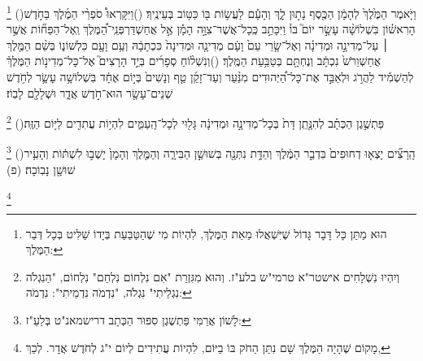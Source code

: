\documentclass[12pt, openany]{book}
\newcommand{\footnotecomment}[1]{
	\renewcommand\thefootnote{}
	\footnote{\textsf{#1}}}
\newcommand{\commenta}[1]{\footnotecomment{#1}\hspace{0em}}
\newcommand{\vsnum}[1]{(\hebrewnumeral{#1})\space}
\begin{document}
{\commenta{ הוּא מַתַּן כָּל דָּבָר גָּדוֹל שֶׁיִּשְׁאֲלוּ מֵאֵת הַמֶּלֶךְ, לִהְיוֹת מִי שֶׁהַטַּבַּעַת בְּיָדוֹ שַׁלִּיט בְּכָל דְּבַר הַמֶּלֶךְ: }%
\vsnum{11}וַיֹּ֤אמֶר הַמֶּ֙לֶךְ֙ לְהָמָ֔ן הַכֶּ֖סֶף נָת֣וּן לָ֑ךְ וְהָעָ֕ם לַעֲשׂ֥וֹת בּ֖וֹ כַּטּ֥וֹב בְּעֵינֶֽיךָ׃
\vsnum{12}וַיִּקָּרְאוּ֩ סֹפְרֵ֨י הַמֶּ֜לֶךְ בַּחֹ֣דֶשׁ הָרִאשׁ֗וֹן בִּשְׁלוֹשָׁ֨ה עָשָׂ֣ר יוֹם֮ בּוֹ֒ וַיִּכָּתֵ֣ב כְּֽכָל־אֲשֶׁר־צִוָּ֣ה הָמָ֡ן אֶ֣ל אֲחַשְׁדַּרְפְּנֵֽי־הַ֠מֶּלֶךְ וְֽאֶל־הַפַּח֞וֹת אֲשֶׁ֣ר ׀ עַל־מְדִינָ֣ה וּמְדִינָ֗ה וְאֶל־שָׂ֤רֵי עַם֙ וָעָ֔ם מְדִינָ֤ה וּמְדִינָה֙ כִּכְתָבָ֔הּ וְעַ֥ם וָעָ֖ם כִּלְשׁוֹנ֑וֹ בְּשֵׁ֨ם הַמֶּ֤לֶךְ אֲחַשְׁוֵרֹשׁ֙ נִכְתָּ֔ב וְנֶחְתָּ֖ם בְּטַבַּ֥עַת הַמֶּֽלֶךְ׃
\vsnum{13}וְנִשְׁל֨וֹחַ סְפָרִ֜ים בְּיַ֣ד הָרָצִים֮ אֶל־כָּל־מְדִינ֣וֹת הַמֶּלֶךְ֒ לְהַשְׁמִ֡יד לַהֲרֹ֣ג וּלְאַבֵּ֣ד אֶת־כָּל־הַ֠יְּהוּדִים מִנַּ֨עַר וְעַד־זָקֵ֜ן טַ֤ף וְנָשִׁים֙ בְּי֣וֹם אֶחָ֔ד בִּשְׁלוֹשָׁ֥ה עָשָׂ֛ר לְחֹ֥דֶשׁ שְׁנֵים־עָשָׂ֖ר הוּא־חֹ֣דֶשׁ אֲדָ֑ר וּשְׁלָלָ֖ם לָבֽוֹז׃%
\commenta{ וְיִהְיוּ נִשְׁלָחִים אישטר"א טרמי"ש בלע"ז. וְהוּא מִגִּזְרַת "אִם נִלְחוֹם נִלְחַם" נִלְחוֹם, "הַנִגְלֹה נִגְלֵיתִי" נִגְלֹה, "נִדְמֹה נִדְמֵיתִי": נִדְמֹה: }%
\vsnum{14}פַּתְשֶׁ֣גֶן הַכְּתָ֗ב לְהִנָּ֤תֵֽן דָּת֙ בְּכָל־מְדִינָ֣ה וּמְדִינָ֔ה גָּל֖וּי לְכָל־הָֽעַמִּ֑ים לִהְי֥וֹת עֲתִדִ֖ים לַיּ֥וֹם הַזֶּֽה׃%
\commenta{ לָשׁוֹן אֲרַמִּי פַּתְשֶׁגֶן סִפּוּר הַכְּתָב דרישמאנ"ט בְּלַעַ"ז: }%
\vsnum{15}הָֽרָצִ֞ים יָצְא֤וּ דְחוּפִים֙ בִּדְבַ֣ר הַמֶּ֔לֶךְ וְהַדָּ֥ת נִתְּנָ֖ה בְּשׁוּשַׁ֣ן הַבִּירָ֑ה וְהַמֶּ֤לֶךְ וְהָמָן֙ יָשְׁב֣וּ לִשְׁתּ֔וֹת וְהָעִ֥יר שׁוּשָׁ֖ן נָבֽוֹכָה׃ (פ)%
\commenta{ מָקוֹם שֶׁהָיָה הַמֶּלֶךְ שָׁם נִתַּן הַחֹק בּוֹ בַיּוֹם, לִהְיוֹת עֲתִידִים לְיוֹם י"ג לְחֹדֶשׁ אֲדָר. לְכַךְ, }%
\clearpage}
\end{document}
